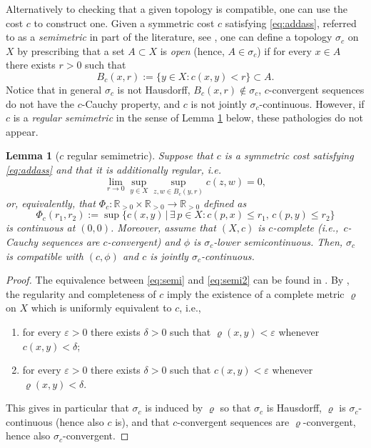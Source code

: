 \documentclass[reqno]{amsart}
\newcounter{results}[section]
\theoremstyle{plain}
\newtheorem{lemma}[results]{Lemma}
\theoremstyle{remark}
\theoremstyle{plain}
\numberwithin{equation}{section}
\theoremstyle{remark}
\newcommand{\R}{\mathbb{R}}
\newcommand{\eps}{\varepsilon}
\begin{document}
Alternatively to checking that a given topology is compatible, one can use the  
cost $c$ 
to  construct  one. Given a  symmetric cost $c$ satisfying \eqref{eq:addass},  referred to as  a {\it semimetric} in part of the literature, see \cite[Section 2]{semim2}, one can define  a topology $\sigma_c$ on  $X$ by prescribing that a set $A\subset X$ is {\it open} (hence, $A\in \sigma_c$)  
if for every $x \in A$ there exists $r>0$ such that
\[ B_c(x,r):=\{y \in X : c(x,y) < r \} \subset A. \]
Notice that in general $\sigma_c$ is not Hausdorff, $B_c(x,r) \notin \sigma_c$, $c$-convergent sequences do not have the $c$-Cauchy property, and $c$ is not  jointly  $\sigma_c$-continuous.   However, if $c$ is a \emph{regular semimetric}  in the sense of Lemma \ref{lem:semi} below,  these pathologies do not appear.   

\begin{lemma}[$c$ regular semimetric]\label{lem:semi} Suppose that  $c$ is a symmetric cost satisfying \eqref{eq:addass} and that it is additionally  \emph{regular}, i.e.
\begin{equation}\label{eq:semi} \lim_{r \to 0 } \sup_{y \in X} \sup_{z,w \in B_c(y,r)} c(z,w)=0,
\end{equation}
or, equivalently, that $\Phi_c:\R_{>0}\times \R_{>0} \to \R_{>0}$ defined as
\begin{equation}\label{eq:semi2}
    \Phi_c(r_1,r_2):=\sup \{ c(x,y) \, | \, \exists \, p \in X: c(p,x) \le r_1, \, c(p,y)\le r_2\}
\end{equation}
is continuous at $(0,0)$.  Moreover, assume that   $(X,c)$ is $c$-complete (i.e.,~$c$-Cauchy sequences are $c$-convergent) and $\phi$ is $\sigma_c$-lower semicontinuous.  Then,   $\sigma_c$ is compatible with $(c,\phi)$ and $c$ is jointly $\sigma_c$-continuous.
\end{lemma}
\begin{proof} The equivalence  between \eqref{eq:semi} and \eqref{eq:semi2}   can be found in \cite[Lemma 1]{bessenyei2014contractionprinciplesemimetricspaces}. By \cite[Theorem 3.2]{semim}, the regularity and completeness of $c$ imply the existence of a complete metric $\varrho$ on $X$ which is uniformly equivalent to $c$, i.e.,
\begin{enumerate}
    \item for every $\eps>0$ there exists $\delta>0$ such that $\varrho(x,y)< \eps$ whenever $c(x,y)< \delta$;
    \item for every $\eps>0$ there exists $\delta>0$ such that $c(x,y)< \eps$ whenever $\varrho(x,y)< \delta$.
\end{enumerate}
This gives in particular that $\sigma_c$ is induced by $\varrho$ so that $\sigma_c$ is Hausdorff, $\varrho$ is $\sigma_c$-continuous (hence also $c$ is), and that $c$-convergent sequences are $\varrho$-convergent, hence also $\sigma_c$-convergent.
\end{proof}
\end{document}
